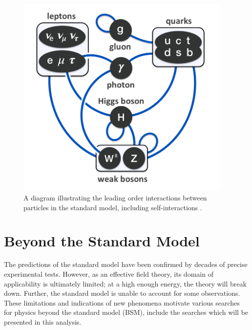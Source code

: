 \begin{figure}[hbt]
\begin{center}
\includegraphics[width=0.95\textwidth]{figures/Elementary_particle_interactions_in_the_Standard_Model.png}
\caption{A diagram illustrating the leading order interactions between particles in the standard model, including self-interactions \cite{Drexler}.}
\label{fig:sm-interactions}
\end{center}
\end{figure}

\addtocounter{section}{-1}
\renewcommand{\thesection}{\thechapter.{$\frac{1}{2}$}}
\section{Beyond the Standard Model}
\renewcommand{\thesection}{\thechapter.\arabic{section}} %

The predictions of the standard model have been confirmed by decades of precise experimental tests. However, as an effective field theory, its domain of applicability is ultimately limited; at a high enough energy, the theory will break down. Further, the standard model is unable to account for some observations. These limitations and indications of new phenomena motivate various searches for physics beyond the standard model (BSM), include the searches which will be presented in this analysis.

